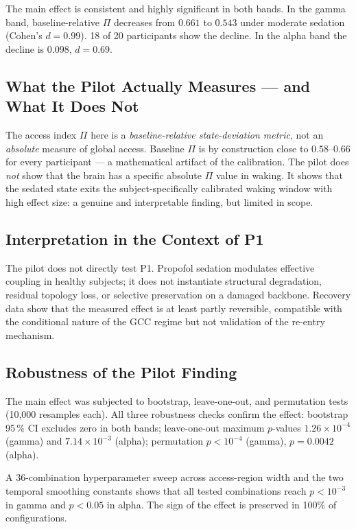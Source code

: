 \documentclass[11pt,a4paper]{article}
\theoremstyle{plain}
\theoremstyle{definition}
\theoremstyle{remark}
\begin{document}
The main effect is consistent and highly significant in both bands. In the gamma band, baseline-relative $\Pi$ decreases from $0.661$ to $0.543$ under moderate sedation (Cohen's $d = 0.99$). 18 of 20 participants show the decline. In the alpha band the decline is $0.098$, $d = 0.69$.

\subsection{What the Pilot Actually Measures --- and What It Does Not}
\label{sec:pilot-framing}

The access index $\Pi$ here is a \emph{baseline-relative state-deviation metric}, not an \emph{absolute} measure of global access. Baseline $\Pi$ is by construction close to $0.58$--$0.66$ for every participant --- a mathematical artifact of the calibration. The pilot does \emph{not} show that the brain has a specific absolute $\Pi$ value in waking. It shows that the sedated state exits the subject-specifically calibrated waking window with high effect size: a genuine and interpretable finding, but limited in scope.

\subsection{Interpretation in the Context of P1}

The pilot does not directly test P1. Propofol sedation modulates effective coupling in healthy subjects; it does not instantiate structural degradation, residual topology loss, or selective preservation on a damaged backbone. Recovery data show that the measured effect is at least partly reversible, compatible with the conditional nature of the GCC regime but not validation of the re-entry mechanism.

\subsection{Robustness of the Pilot Finding}

The main effect was subjected to bootstrap, leave-one-out, and permutation tests (10{,}000 resamples each). All three robustness checks confirm the effect: bootstrap 95\,\% CI excludes zero in both bands; leave-one-out maximum $p$-values $1.26 \times 10^{-4}$ (gamma) and $7.14 \times 10^{-3}$ (alpha); permutation $p < 10^{-4}$ (gamma), $p = 0.0042$ (alpha).

A 36-combination hyperparameter sweep across access-region width and the two temporal smoothing constants shows that all tested combinations reach $p < 10^{-3}$ in gamma and $p < 0.05$ in alpha. The sign of the effect is preserved in 100\% of configurations.
\end{document}
